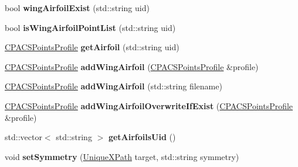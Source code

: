 \begin{DoxyCompactItemize}
\item 
\hypertarget{classcpcr_1_1CPACSFile_ab6b523a08f8fd1a4295428da92a4f5f4}{bool {\bfseries wing\-Airfoil\-Exist} (std\-::string uid)}\label{classcpcr_1_1CPACSFile_ab6b523a08f8fd1a4295428da92a4f5f4}

\item 
\hypertarget{classcpcr_1_1CPACSFile_a558165081bad2dd9cd210ac7a65e11b1}{bool {\bfseries is\-Wing\-Airfoil\-Point\-List} (std\-::string uid)}\label{classcpcr_1_1CPACSFile_a558165081bad2dd9cd210ac7a65e11b1}

\item 
\hypertarget{classcpcr_1_1CPACSFile_a546eaa2519400ec8e518870e3dbf5ef2}{\hyperlink{classcpcr_1_1CPACSPointsProfile}{C\-P\-A\-C\-S\-Points\-Profile} {\bfseries get\-Airfoil} (std\-::string uid)}\label{classcpcr_1_1CPACSFile_a546eaa2519400ec8e518870e3dbf5ef2}

\item 
\hypertarget{classcpcr_1_1CPACSFile_a7c894f0135af605d436116ff954a570b}{\hyperlink{classcpcr_1_1CPACSPointsProfile}{C\-P\-A\-C\-S\-Points\-Profile} {\bfseries add\-Wing\-Airfoil} (\hyperlink{classcpcr_1_1CPACSPointsProfile}{C\-P\-A\-C\-S\-Points\-Profile} \&profile)}\label{classcpcr_1_1CPACSFile_a7c894f0135af605d436116ff954a570b}

\item 
\hypertarget{classcpcr_1_1CPACSFile_a6b76aab1e627d53cd599ea80fd4a4182}{\hyperlink{classcpcr_1_1CPACSPointsProfile}{C\-P\-A\-C\-S\-Points\-Profile} {\bfseries add\-Wing\-Airfoil} (std\-::string filename)}\label{classcpcr_1_1CPACSFile_a6b76aab1e627d53cd599ea80fd4a4182}

\item 
\hypertarget{classcpcr_1_1CPACSFile_a48cdcb1083710dbd943a3d9c31bb6adc}{\hyperlink{classcpcr_1_1CPACSPointsProfile}{C\-P\-A\-C\-S\-Points\-Profile} {\bfseries add\-Wing\-Airfoil\-Overwrite\-If\-Exist} (\hyperlink{classcpcr_1_1CPACSPointsProfile}{C\-P\-A\-C\-S\-Points\-Profile} \&profile)}\label{classcpcr_1_1CPACSFile_a48cdcb1083710dbd943a3d9c31bb6adc}

\item 
\hypertarget{classcpcr_1_1CPACSFile_aee4c89f47ccb5467eccac3a8e14061ca}{std\-::vector$<$ std\-::string $>$ {\bfseries get\-Airfoils\-Uid} ()}\label{classcpcr_1_1CPACSFile_aee4c89f47ccb5467eccac3a8e14061ca}

\item 
\hypertarget{classcpcr_1_1CPACSFile_a2267d01a192aca25c38dcde09dffb677}{void {\bfseries set\-Symmetry} (\hyperlink{classcpcr_1_1UniqueXPath}{Unique\-X\-Path} target, std\-::string symmetry)}\label{classcpcr_1_1CPACSFile_a2267d01a192aca25c38dcde09dffb677}


\end{DoxyCompactItemize}
